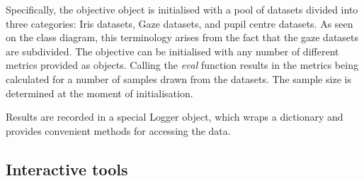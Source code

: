 Specifically, the objective object is initialised with a pool of datasets divided into three categories: Iris datasets, Gaze datasets, and pupil centre datasets. As seen on the class diagram, this terminology arises from the fact that the gaze datasets are subdivided. The objective can be initialised with any number of different metrics provided as objects. Calling the \emph{eval} function results in the metrics being calculated for a number of samples drawn from the datasets. The sample size is determined at the moment of initialisation.

Results are recorded in a special Logger object, which wraps a dictionary and provides convenient methods for accessing the data.

\subsection{Interactive tools}
